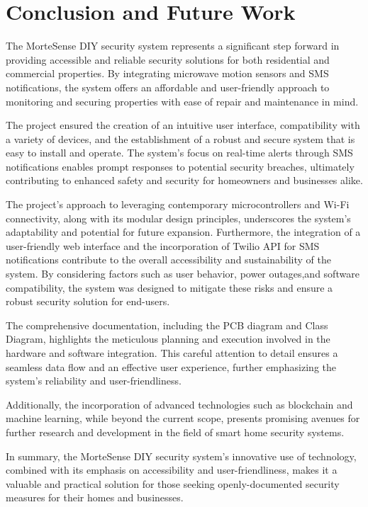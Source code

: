 \section{Conclusion and Future Work}\label{sec:conclusion-and-future-work}

The MorteSense DIY security system represents a significant step forward in providing
accessible and reliable security solutions for both residential and commercial properties. %
By integrating microwave motion sensors and SMS notifications, the system offers an
affordable and user-friendly approach to monitoring and securing properties with ease of
repair and maintenance in mind. %

The project ensured the creation of an intuitive user interface, compatibility with a variety
of devices, and the establishment of a robust and secure system that is easy to install and operate. %
The system's focus on real-time alerts through SMS notifications enables prompt responses to
potential security breaches, ultimately contributing to enhanced safety and security for
homeowners and businesses alike. %

The project's approach to leveraging contemporary microcontrollers and Wi-Fi connectivity, along
with its modular design principles, underscores the system's adaptability and potential for
future expansion. %
Furthermore, the integration of a user-friendly web interface and the incorporation of Twilio API for SMS notifications contribute to the overall accessibility
and sustainability of the system. %
By considering factors such as user behavior, power outages,and software compatibility, the system was designed to mitigate these risks and ensure a
robust security solution for end-users. %

The comprehensive documentation, including the PCB diagram and Class Diagram, highlights the
meticulous planning and execution involved in the hardware and software integration. %
This careful attention to detail ensures a seamless data flow and an effective user experience,
further emphasizing the system's reliability and user-friendliness. %

Additionally, the incorporation of advanced technologies such as blockchain and machine
learning, while beyond the current scope, presents promising avenues for further
research and development in the field of smart home security systems. %

In summary, the MorteSense DIY security system's innovative use of technology, combined with
its emphasis on accessibility and user-friendliness, makes it a valuable and practical
solution for those seeking openly-documented security measures for their homes and businesses. %

